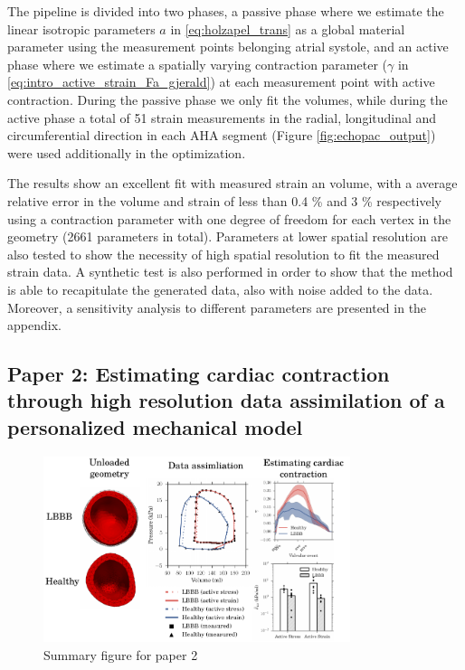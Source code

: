 The pipeline is divided into two phases, a passive phase where we
estimate the linear isotropic parameters $a$ in
\eqref{eq:holzapel_trans} as a global material parameter using the
measurement points belonging atrial systole, and an active phase where we estimate
a spatially varying contraction parameter ($\gamma$ in
\eqref{eq:intro_active_strain_Fa_gjerald}) at each measurement point
with active contraction. During the passive phase we only fit the
volumes, while during the active phase a total of 51 strain measurements in the radial,
longitudinal and circumferential direction in each AHA segment (Figure
\ref{fig:echopac_output}) were used additionally in the optimization. 

The results show an excellent fit with measured strain an volume, with
a average relative error in the volume and strain of less than 0.4 \% and 3 \%
respectively using a contraction parameter with one degree of freedom
for each vertex in the geometry (2661 parameters in total). Parameters
at lower spatial resolution are also tested to show the necessity of
high spatial resolution to fit the measured strain data.
A synthetic test is also performed in order to show that the method
is able to recapitulate the generated data, also with noise added to
the data. Moreover, a sensitivity analysis to different parameters are
presented in the appendix.


\subsection{Paper 2: Estimating cardiac contraction through high resolution
  data assimilation of a personalized mechanical model}


\begin{figure}[htbp]
  \centering
    \includegraphics[width=0.8\textwidth]{chapters/introduction/figures/paper2}
\caption{Summary figure for paper 2}
\label{fig:paper2}
\end{figure}

